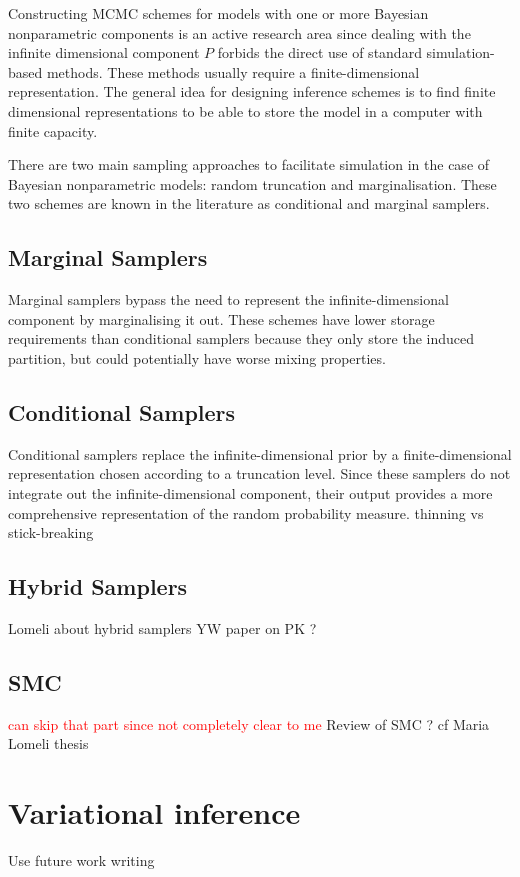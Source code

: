 Constructing MCMC schemes for models with one or more Bayesian nonparametric components is an active research area since dealing with the infinite dimensional component $P$ forbids the direct use of standard simulation-based methods. These methods usually require a finite-dimensional representation. The general idea for designing inference schemes is to find finite dimensional representations to be able to store the model in a computer with finite capacity.

There are two main sampling approaches to facilitate simulation in the case of Bayesian nonparametric models: random truncation and marginalisation. These two schemes are known in the literature as conditional and marginal samplers.

\subsection{Marginal Samplers}
Marginal samplers bypass the need to represent the infinite-dimensional component by marginalising it out. These schemes have lower storage requirements than conditional samplers because they only store the induced partition, but could potentially have worse mixing properties.

\subsection{Conditional Samplers}
Conditional samplers replace the infinite-dimensional prior by a finite-dimensional representation chosen according to a truncation level. Since these samplers do not integrate out the infinite-dimensional component, their output provides a more comprehensive representation of the random probability measure.
thinning vs stick-breaking

\subsection{Hybrid Samplers}
Lomeli about hybrid samplers
YW paper on PK ?

\subsection{SMC}
\textcolor{red}{can skip that part since not completely clear to me}
Review of SMC ?
cf Maria Lomeli thesis


\section{Variational inference}
Use future work writing
